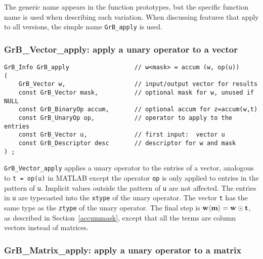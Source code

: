 \documentclass[12pt]{article}
\begin{document}
The generic
name appears in the function prototypes, but the specific function name is used
when describing each variation.  When discussing features that apply to all
versions, the simple name \verb'GrB_apply' is used.

\newpage
\subsubsection{{\sf GrB\_Vector\_apply:} apply a unary operator to a vector}
\label{apply_vector}

\begin{mdframed}[userdefinedwidth=6in]
{\footnotesize
\begin{verbatim}
GrB_Info GrB_apply                  // w<mask> = accum (w, op(u))
(
    GrB_Vector w,                   // input/output vector for results
    const GrB_Vector mask,          // optional mask for w, unused if NULL
    const GrB_BinaryOp accum,       // optional accum for z=accum(w,t)
    const GrB_UnaryOp op,           // operator to apply to the entries
    const GrB_Vector u,             // first input:  vector u
    const GrB_Descriptor desc       // descriptor for w and mask
) ;
\end{verbatim} } \end{mdframed}

\verb'GrB_Vector_apply' applies a unary operator to the entries of a vector,
analogous to \verb't = op(u)'  in MATLAB except the operator \verb'op' is only
applied to entries in the pattern of \verb'u'.  Implicit values outside the
pattern of \verb'u' are not affected.  The entries in \verb'u' are typecasted
into the \verb'xtype' of the unary operator.  The vector \verb't' has the same
type as the \verb'ztype' of the unary operator.  The final step is ${\bf w
\langle m \rangle  = w \odot t}$, as described in Section~\ref{accummask},
except that all the terms are column vectors instead of matrices.

\newpage
\subsubsection{{\sf GrB\_Matrix\_apply:} apply a unary operator to a matrix}
\label{apply_matrix}
\end{document}
